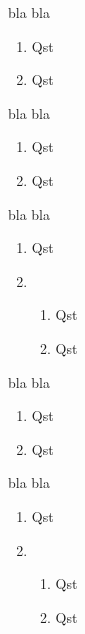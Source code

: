 \documentclass[12pt,a4paper]{report}
\newcommand{\be}{\begin{enumerate}}
\newcommand{\ee}{\end{enumerate}}
\begin{document}
\begin{multicols*}{2}
\begin{boxx}
 bla bla
 \be 
 \item Qst
 \item Qst
 \ee
\end{boxx}
\begin{boxx}
 bla bla
 \be 
 \item Qst
 \item Qst
 \ee
\end{boxx}
\begin{boxx}
 bla bla
 \be 
 \item Qst
 \item \be 
 \item Qst
 \item Qst
 \ee
 \ee
\end{boxx}
\begin{boxx}
 bla bla
 \be 
 \item Qst
 \item Qst
 \ee
\end{boxx}
\begin{boxx}
 bla bla
 \be 
 \item Qst
 \item \be 
 \item Qst
 \item Qst
 \ee
 \ee
\end{boxx}
\end{multicols*}
\end{document}
